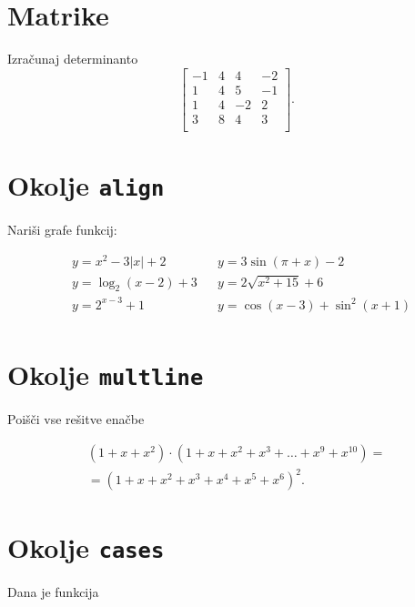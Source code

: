 \documentclass[a4paper,12pt]{article}
\begin{document}
\section*{Matrike}
Izračunaj determinanto
\[
\begin{bmatrix}
   -1 & 4 & 4 & -2 \\
    1 & 4 & 5 & -1 \\
    1 & 4 & -2 & 2 \\
    3 & 8 & 4 & 3 \\
\end{bmatrix}.
\]


\section*{Okolje \texttt{align}}
Nariši grafe funkcij:

\begin{align*}
 &y = x^2 - 3|x| + 2    &&y = 3 \sin(\pi+x) - 2\\
 &y = \log_2(x-2) + 3   &&y = 2 \sqrt{x^2+15} + 6\\
 &y = 2^{x-3} + 1       &&y = \cos(x-3) + \sin^2(x+1)\\
 \end{align*}

\section*{Okolje \texttt{multline}}
Poišči vse rešitve enačbe


\begin{multline*}
   (1+x+x^2) \cdot (1+x+x^2+x^3+\ldots +x^9+x^{10}) =\\
   =(1+x+x^2+x^3+x^4+x^5+x^6)^2.
\end{multline*}

\section*{Okolje \texttt{cases}}
Dana je funkcija
\end{document}
